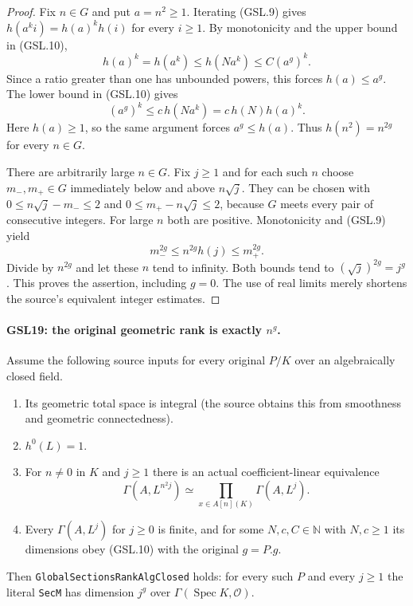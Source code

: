 \documentclass[11pt,a4paper]{article}
\numberwithin{equation}{section}
\theoremstyle{remark}\newtheorem{remark}[theorem]{Remark}
\begin{document}
\begin{proof}
Fix $n\in G$ and put $a=n^2\ge1$.  Iterating (GSL.9) gives
$h(a^ki)=h(a)^kh(i)$ for every $i\ge1$.  By monotonicity and
the upper bound in (GSL.10),
\[
 h(a)^k=h(a^k)\le h(Na^k)\le C(a^g)^k.
\]
Since a ratio greater than one has unbounded powers, this
forces $h(a)\le a^g$.  The lower bound in (GSL.10) gives
\[
 (a^g)^k\le c\,h(Na^k)=c\,h(N)h(a)^k.
\]
Here $h(a)\ge1$, so the same argument forces $a^g\le h(a)$.
Thus $h(n^2)=n^{2g}$ for every $n\in G$.

There are arbitrarily large $n\in G$.  Fix $j\ge1$ and for each
such $n$ choose $m_-,m_+\in G$ immediately below and above
$n\sqrt j$.  They can be chosen with
$0\le n\sqrt j-m_-\le2$ and
$0\le m_+-n\sqrt j\le2$, because $G$ meets every pair of
consecutive integers.  For large $n$ both are positive.
Monotonicity and (GSL.9) yield
\[
 m_-^{2g}\le n^{2g}h(j)\le m_+^{2g}.
\]
Divide by $n^{2g}$ and let these $n$ tend to infinity.
Both bounds tend to $(\sqrt j)^{2g}=j^g$.
This proves the assertion, including $g=0$.  The use of real
limits merely shortens the source's equivalent integer estimates.
\end{proof}

\paragraph{GSL19: the original geometric rank is exactly \(n^g\).}
\label{claim:GSL19}
Assume the following source inputs for every original $P/K$ over
an algebraically closed field.

\begin{enumerate}
 \item Its geometric total space is integral (the source obtains this
 from smoothness and geometric connectedness).
 \item $h^0(L)=1$.
 \item For $n\ne0$ in $K$ and $j\ge1$ there is an actual
 coefficient-linear equivalence
 \[
 \Gamma(A,L^{n^2j})\simeq
       \prod_{x\in A[n](K)}\Gamma(A,L^j).
 \tag{GSL.11}
 \]
 \item Every $\Gamma(A,L^j)$ for $j\ge0$ is finite, and for some
 $N,c,C\in\mathbb N$ with $N,c\ge1$ its dimensions obey
 (GSL.10) with the original $g=P.g$.
\end{enumerate}
Then \texttt{Global\allowbreak Sections\allowbreak Rank\allowbreak Alg\allowbreak Closed} holds: for every such
$P$ and every $j\ge1$ the literal \texttt{Sec\allowbreak M} has dimension $j^g$
over $\Gamma(\operatorname{Spec}K,\mathcal O)$.
\end{document}
